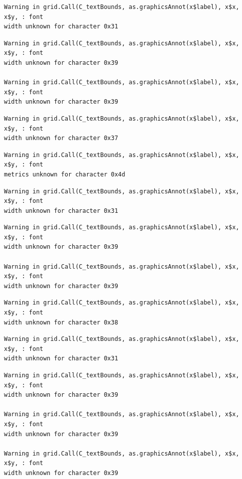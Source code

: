 \documentclass[
  letterpaper,
  DIV=11,
  numbers=noendperiod]{scrreprt}
\begin{document}
\begin{verbatim}
Warning in grid.Call(C_textBounds, as.graphicsAnnot(x$label), x$x, x$y, : font
width unknown for character 0x31
\end{verbatim}

\begin{verbatim}
Warning in grid.Call(C_textBounds, as.graphicsAnnot(x$label), x$x, x$y, : font
width unknown for character 0x39

Warning in grid.Call(C_textBounds, as.graphicsAnnot(x$label), x$x, x$y, : font
width unknown for character 0x39
\end{verbatim}

\begin{verbatim}
Warning in grid.Call(C_textBounds, as.graphicsAnnot(x$label), x$x, x$y, : font
width unknown for character 0x37
\end{verbatim}

\begin{verbatim}
Warning in grid.Call(C_textBounds, as.graphicsAnnot(x$label), x$x, x$y, : font
metrics unknown for character 0x4d
\end{verbatim}

\begin{verbatim}
Warning in grid.Call(C_textBounds, as.graphicsAnnot(x$label), x$x, x$y, : font
width unknown for character 0x31
\end{verbatim}

\begin{verbatim}
Warning in grid.Call(C_textBounds, as.graphicsAnnot(x$label), x$x, x$y, : font
width unknown for character 0x39

Warning in grid.Call(C_textBounds, as.graphicsAnnot(x$label), x$x, x$y, : font
width unknown for character 0x39
\end{verbatim}

\begin{verbatim}
Warning in grid.Call(C_textBounds, as.graphicsAnnot(x$label), x$x, x$y, : font
width unknown for character 0x38
\end{verbatim}

\begin{verbatim}
Warning in grid.Call(C_textBounds, as.graphicsAnnot(x$label), x$x, x$y, : font
width unknown for character 0x31
\end{verbatim}

\begin{verbatim}
Warning in grid.Call(C_textBounds, as.graphicsAnnot(x$label), x$x, x$y, : font
width unknown for character 0x39

Warning in grid.Call(C_textBounds, as.graphicsAnnot(x$label), x$x, x$y, : font
width unknown for character 0x39

Warning in grid.Call(C_textBounds, as.graphicsAnnot(x$label), x$x, x$y, : font
width unknown for character 0x39
\end{verbatim}
\end{document}
